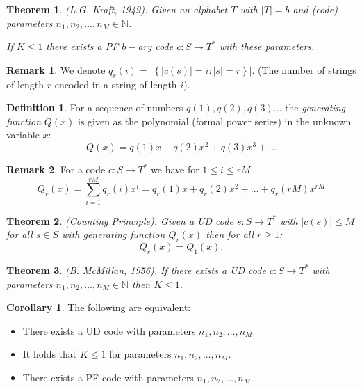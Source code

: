 \documentclass[a4paper]{article}
\newtheorem{theorem}{Theorem}
\theoremstyle{definition} \newtheorem*{definition}{Definition}
\newtheorem*{corollary}{Corollary} \newtheorem*{remark}{Remark}
\newcommand{\naturals}{\mathbb{N}}
\begin{document}
\begin{theorem}
  (L.G. Kraft, 1949). Given an alphabet $T$ with $|T| = b$ and (code)
  parameters $n_1, n_2, \dots, n_M \in \naturals$. 
  
  If $K \leq 1$ there
  exists a PF $b-$ary code $c:S \rightarrow T^*$ with these parameters.
  \label{thm:lgkraft}
\end{theorem}

\begin{remark}
  We denote $q_r(i) = \Big| \left\{ |c(s)|=i : |s| = r \right\} \Big|$.
  (The number of strings of length $r$ encoded
  in a string of length $i$).
\end{remark}

\begin{definition}
  For a sequence of numbers $q(1), q(2), q(3)\dots$ the \emph{generating function} $Q(x)$ is given as the polynomial (formal power series) in the 
  unknown variable $x$:
  \[
    Q(x) = q(1)x + q(2)x^2 + q(3)x^3 + \dots
  \]
\end{definition}

\begin{remark}
  For a code $c:S \rightarrow T^*$ we have for $1 \leq i \leq rM$:
  \[
    Q_r(x) = \sum_{i=1}^{rM} q_r(i)x^i =  q_r(1)x + q_r(2)x^2 + \dots + q_r(rM)x^{rM}
  \]
\end{remark}

\begin{theorem}(Counting Principle).
  Given a UD code $s:S \rightarrow T^*$ with $|c(s)| \leq M$ for all
  $s \in S$ with generating function $Q_r(x)$ then for all $r \geq 1$:
  \[
    Q_r(x) = Q_1(x).
  \]
  \label{conutingprinciple}
\end{theorem}

\begin{theorem}
  (B. McMillan, 1956). If there exists a UD code $c :S \rightarrow T^*$
  with parameters $n_1,n_2, \dots, n_M \in \naturals$ then $K\leq 1$.
  \label{bmcmillan}
\end{theorem}

\begin{corollary}
  The following are equivalent:
  \begin{itemize}
    \item There exists a UD code with parameters $n_1, n_2, \dots, n_M$.
    \item It holds that $K \leq 1$ for parameters $n_1,n_2, \dots, n_M$.
    \item There exists a PF code with parameters $n_1,n_2, \dots, n_M$.
  \end{itemize}
\end{corollary}
\end{document}

